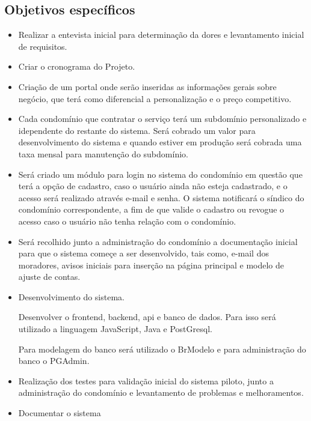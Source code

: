 \subsection{Objetivos específicos}
\begin{itemize}
    \item Realizar a entevista inicial para determinação da dores e levantamento
    inicial de requisitos.
    
    \item Criar o cronograma do Projeto.
    
    \item Criação de um portal onde serão inseridas as informações gerais sobre
negócio, que terá como diferencial a personalização e o preço competitivo.
    
    \item Cada condomínio que contratar o serviço terá um subdomínio personalizado
e idependente do restante do sistema. Será cobrado um valor para desenvolvimento
do sistema e quando estiver em produção será cobrada uma taxa mensal para manutenção
do subdomínio.

    \item Será criado um módulo para login no sistema do condomínio em questão
que terá a opção de cadastro, caso o usuário ainda não esteja cadastrado,
e o acesso será realizado através e-mail e senha. O sistema notificará o síndico
do condomínio correspondente, a fim de que valide o cadastro ou revogue o acesso
caso o usuário não tenha relação com o condomínio.

    \item Será recolhido junto a administração do condomínio a documentação 
inicial para que o sistema começe a ser desenvolvido, tais como, e-mail
dos moradores, avisos iniciais para inserção na página principal e modelo de
ajuste de contas.

    \item Desenvolvimento do sistema.
    
    Desenvolver o frontend, backend, api e banco de dados. Para isso será 
utilizado a linguagem JavaScript, Java e PostGresql.

    Para modelagem do banco será utilizado o BrModelo e para administração do banco
o PGAdmin.

    \item Realização dos testes para validação inicial do sistema piloto, junto a
administração do condomínio e levantamento de problemas e melhoramentos.

    \item Documentar o sistema
    
\end{itemize}

